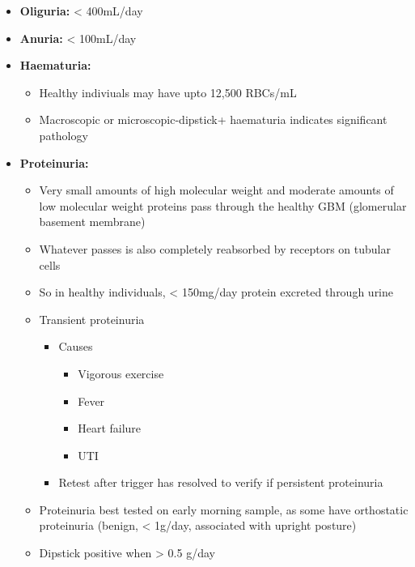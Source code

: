 \documentclass[
  12pt,
]{memoir}
\providecommand{\tightlist}{%
  \setlength{\itemsep}{0pt}\setlength{\parskip}{0pt}}
\begin{document}
\begin{itemize}
\tightlist
\item
  \textbf{Oliguria:} \textless{} 400mL/day
\item
  \textbf{Anuria:} \textless{} 100mL/day
\item
  \textbf{Haematuria:}

  \begin{itemize}
  \tightlist
  \item
    Healthy indiviuals may have upto 12,500 RBCs/mL
  \item
    Macroscopic or microscopic-dipstick+ haematuria indicates
    significant pathology
  \end{itemize}
\item
  \textbf{Proteinuria:}

  \begin{itemize}
  \tightlist
  \item
    Very small amounts of high molecular weight and moderate amounts of
    low molecular weight proteins pass through the healthy GBM
    (glomerular basement membrane)
  \item
    Whatever passes is also completely reabsorbed by receptors on
    tubular cells
  \item
    So in healthy individuals, \textless{} 150mg/day protein excreted
    through urine
  \item
    Transient proteinuria

    \begin{itemize}
    \tightlist
    \item
      Causes

      \begin{itemize}
      \tightlist
      \item
        Vigorous exercise
      \item
        Fever
      \item
        Heart failure
      \item
        UTI
      \end{itemize}
    \item
      Retest after trigger has resolved to verify if persistent
      proteinuria
    \end{itemize}
  \item
    Proteinuria best tested on early morning sample, as some have
    orthostatic proteinuria (benign, \textless{} 1g/day, associated with
    upright posture)
  \item
    Dipstick positive when \textgreater{} 0.5 g/day


\end{itemize}
\end{itemize}
\end{document}
